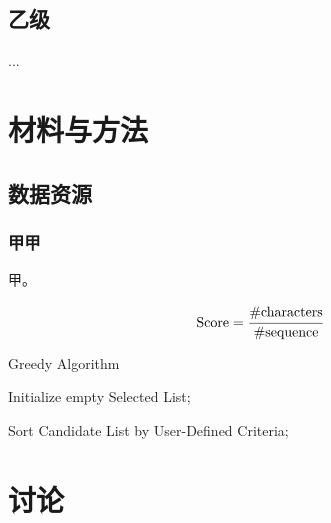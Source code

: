\documentclass[UTF8,12pt]{ctexart}
\begin{document}
    \subsection{乙级}

    ...


\section{材料与方法}

\subsection{数据资源}

\subsubsection{甲甲}

    甲\cite{10.1093/nar/gky995}。

    \begin{equation}
        \text{Score}= \cfrac{\#\text{characters}}{\#\text{sequence}}
        \label{equ:score}
    \end{equation}

    \begin{algorithm}[H]
        \caption{Greedy Algorithm}
        \BlankLine
        Initialize empty Selected List;
        
        Sort Candidate List by User-Defined Criteria;
            
    \end{algorithm}

\section{讨论}

\end{document}
